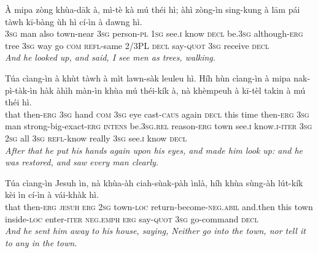 \documentclass[11pt,a4paper]{article}
\begin{document}
\begin{exe}
\gll À mipa zòng khùa-dāk à, mì-tè kà mú théi hì; àhì zòng-ìn sing-kung à lām pái tàwh kī-bàng ùh hì cí-ìn à dawng hì. \\
     \textsc{3sg} man also town-near \textsc{3sg} person-\textsc{pl} \textsc{1sg} see.\textsc{i} know \textsc{decl} be.\textsc{3sg} although-\textsc{erg} tree \textsc{3sg} way go \textsc{com} \textsc{refl}-same 2/3PL \textsc{decl} say-\textsc{quot} \textsc{3sg} receive \textsc{decl} \\
\glt \textcolor{kjvcolor}{\textit{And he looked up, and said, I see men as trees, walking.}}

\gll Túa cìang-ìn à khùt tàwh à mìt lawn-sàk leuleu hì. Híh hùn cìang-ìn à mipa nak-pì-tàk-ìn hàk àhìh màn-ìn khùa mú théi-kík à, nà khèmpeuh à kī-tèl takin à mú théi hì. \\
     that then-\textsc{erg} \textsc{3sg} hand \textsc{com} \textsc{3sg} eye cast-\textsc{caus} again \textsc{decl} this time then-\textsc{erg} \textsc{3sg} man strong-big-exact-\textsc{erg} \textsc{intens} be.\textsc{3sg}.\textsc{rel} reason-\textsc{erg} town see.\textsc{i} know.\textsc{i}-\textsc{iter} \textsc{3sg} \textsc{2sg} all \textsc{3sg} \textsc{refl}-know really \textsc{3sg} see.\textsc{i} know \textsc{decl} \\
\glt \textcolor{kjvcolor}{\textit{After that he put his hands again upon his eyes, and made him look up: and he was restored, and saw every man clearly.}}

\gll Túa cìang-ìn Jesuh ìn, nà khùa-àh ciah-sùak-pàh ìnlà, híh khùa sùng-àh lút-kík kèi ìn cí-ìn à vái-khàk hì. \\
     that then-\textsc{erg} \textsc{jesuh} \textsc{erg} \textsc{2sg} town-\textsc{loc} return-become-\textsc{neg}.\textsc{abil} and.then this town inside-\textsc{loc} enter-\textsc{iter} \textsc{neg}.\textsc{emph} \textsc{erg} say-\textsc{quot} \textsc{3sg} go-command \textsc{decl} \\
\glt \textcolor{kjvcolor}{\textit{And he sent him away to his house, saying, Neither go into the town, nor tell it to any in the town.}}


\end{exe}
\end{document}
